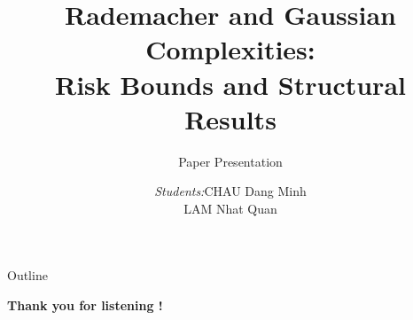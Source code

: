 \documentclass[xcolor=dvipsnames, aspectratio=169, 10pt]{beamer}
\title[]{Rademacher and Gaussian Complexities: \\ Risk Bounds and Structural Results}
\subtitle{Paper Presentation}
\author[Minh]{
		\begin{tabular}{lll}
			\textit{\small Students:} & \small CHAU Dang Minh \\
			& \small LAM Nhat Quan \\
            \vspace{.5cm}\\
		\end{tabular}
	}
\begin{document}
\date{}
\begin{frame}
  \titlepage
\end{frame}

\begin{frame}{Outline}
  \tableofcontents
\end{frame}








\begin{frame}
  \begin{center}
    \Huge\textbf{Thank you for listening !}
  \end{center}
\end{frame}


\end{document}
